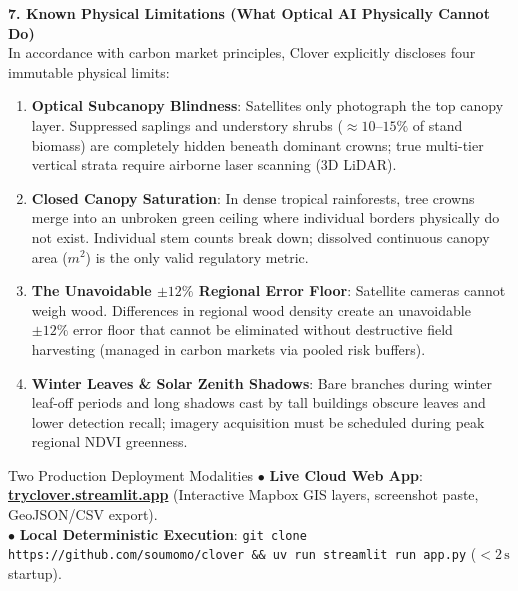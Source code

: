 \documentclass[10pt,a4paper]{article}
\begin{document}
\vspace{0.2em}
\noindent\textbf{\large 7. Known Physical Limitations (What Optical AI Physically Cannot Do)}\\[0.25em]
In accordance with carbon market principles, Clover explicitly discloses four immutable physical limits:
\begin{enumerate}
    \item \textbf{Optical Subcanopy Blindness}: Satellites only photograph the top canopy layer. Suppressed saplings and understory shrubs ($\approx 10\text{--}15\%$ of stand biomass) are completely hidden beneath dominant crowns; true multi-tier vertical strata require airborne laser scanning (3D LiDAR).
    \item \textbf{Closed Canopy Saturation}: In dense tropical rainforests, tree crowns merge into an unbroken green ceiling where individual borders physically do not exist. Individual stem counts break down; dissolved continuous canopy area ($m^2$) is the only valid regulatory metric.
    \item \textbf{The Unavoidable $\pm 12\%$ Regional Error Floor}: Satellite cameras cannot weigh wood. Differences in regional wood density create an unavoidable $\pm 12\%$ error floor that cannot be eliminated without destructive field harvesting (managed in carbon markets via pooled risk buffers).
    \item \textbf{Winter Leaves \& Solar Zenith Shadows}: Bare branches during winter leaf-off periods and long shadows cast by tall buildings obscure leaves and lower detection recall; imagery acquisition must be scheduled during peak regional NDVI greenness.
\end{enumerate}

\vspace{0.2em}
\begin{calloutbox}{Two Production Deployment Modalities}
\footnotesize
$\bullet$ \textbf{Live Cloud Web App}: \href{https://tryclover.streamlit.app}{\textbf{tryclover.streamlit.app}} (Interactive Mapbox GIS layers, screenshot paste, GeoJSON/CSV export).\\[0.2em]
$\bullet$ \textbf{Local Deterministic Execution}: \texttt{git clone https://github.com/soumomo/clover \&\& uv run streamlit run app.py} ($<2\,\text{s}$ startup).
\end{calloutbox}
\end{document}
